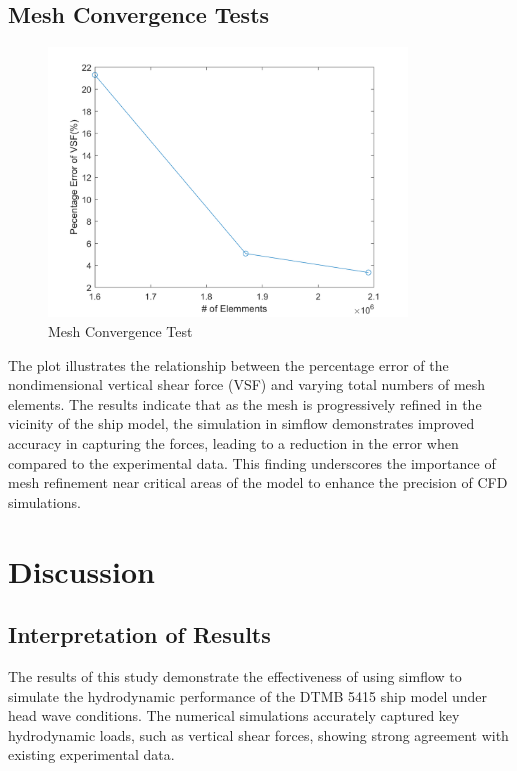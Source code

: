 \documentclass[12pt]{article} %
\begin{document}
\subsection{Mesh Convergence Tests}
\begin{figure}[ht]
    \centering
    \includegraphics[width=0.85\textwidth]{MCT.png}
    \caption{Mesh Convergence Test}
\end{figure}
The plot illustrates the relationship between the percentage error of the nondimensional vertical shear 
force (VSF) and varying total numbers of mesh elements.
The results indicate that as the mesh is progressively refined in the vicinity of the ship model, the 
simulation in simflow demonstrates improved accuracy in capturing the forces, leading to a reduction 
in the error when compared to the experimental data. This finding underscores the importance of mesh 
refinement near critical areas of the model to enhance the precision of CFD simulations.  

\clearpage
\section{Discussion}

\subsection{Interpretation of Results}
The results of this study demonstrate the effectiveness of using simflow to simulate the 
hydrodynamic performance of the DTMB 5415 ship model under head wave conditions. The numerical 
simulations accurately captured key hydrodynamic loads, such as vertical shear forces, showing strong 
agreement with existing experimental data. 
\end{document}
